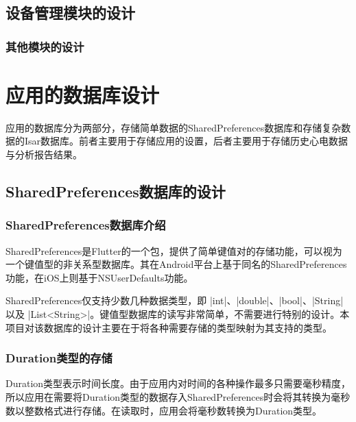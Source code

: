 
\subsection{设备管理模块的设计}\label{subsec:device-design}


\subsubsection{其他模块的设计}\label{subsubsec:other-design}



\section{应用的数据库设计}\label{sec:db-design}

应用的数据库分为两部分，存储简单数据的SharedPreferences数据库和存储复杂数据的Isar数据库。前者主要用于存储应用的设置，后者主要用于存储历史心电数据与分析报告结果。

\subsection{SharedPreferences数据库的设计}\label{subsec:shared-preferences}

\subsubsection{SharedPreferences数据库介绍}\label{subsubsec:shared-preferences-intro}

SharedPreferences是Flutter的一个包，提供了简单键值对的存储功能，可以视为一个键值型的非关系型数据库。其在Android平台上基于同名的SharedPreferences功能，在iOS上则基于NSUserDefaults功能。

SharedPreferences仅支持少数几种数据类型，即 |int|、|double|、|bool|、|String| 以及 |List<String>|。键值型数据库的读写非常简单，不需要进行特别的设计。本项目对该数据库的设计主要在于将各种需要存储的类型映射为其支持的类型。

\subsubsection{Duration类型的存储}\label{subsubsec:duration-storage}

Duration类型表示时间长度。由于应用内对时间的各种操作最多只需要毫秒精度，所以应用在需要将Duration类型的数据存入SharedPreferences时会将其转换为毫秒数以整数格式进行存储。在读取时，应用会将毫秒数转换为Duration类型。

